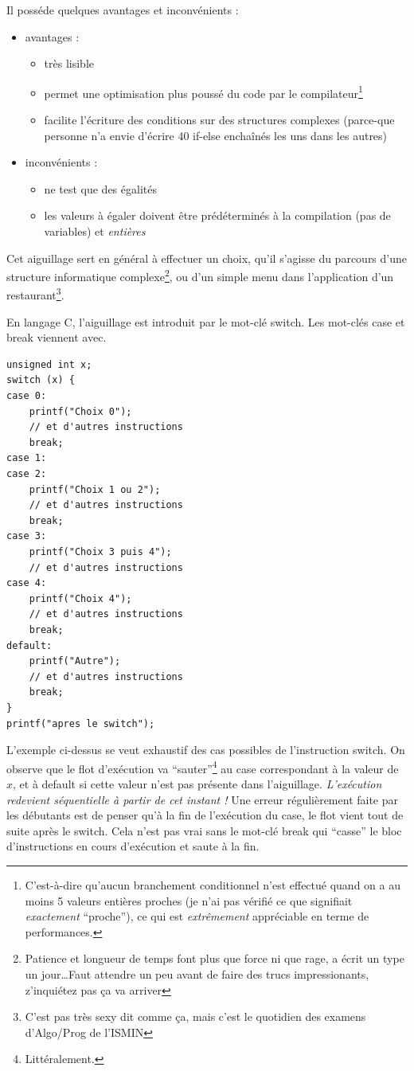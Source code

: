 \documentclass[../../../main.tex]{subfiles}
\begin{document}
Il posséde quelques avantages et inconvénients :
\begin{itemize}
	\item avantages :
	\begin{itemize}
		\item très lisible
		\item permet une optimisation plus poussé du code par le compilateur\footnote{C'est-à-dire qu'aucun branchement conditionnel n'est effectué quand on a au moins 5 valeurs entières proches (je n'ai pas vérifié ce que signifiait \textit{exactement} ``proche''), ce qui est \textit{extrêmement} appréciable en terme de performances.}
		\item facilite l'écriture des conditions sur des structures complexes (parce-que personne n'a envie d'écrire 40 \textsf{if-else} enchaînés les uns dans les autres)
	\end{itemize}
	\item inconvénients : 
	\begin{itemize}
		\item ne test que des égalités
		\item les valeurs à égaler doivent être prédéterminés à la compilation (pas de variables) et \textit{entières}
	\end{itemize}
\end{itemize}
Cet aiguillage sert en général à effectuer un choix, qu'il s'agisse du parcours d'une structure informatique complexe\footnote{Patience et longueur de temps font plus que force ni que rage, a écrit un type un jour\dots Faut attendre un peu avant de faire des trucs impressionants, z'inquiétez pas ça va arriver}, ou d'un simple menu dans l'application d'un restaurant\footnote{C'est pas très sexy dit comme ça, mais c'est le quotidien des examens d'Algo/Prog de l'ISMIN}.
 
En langage C, l'aiguillage est introduit par le mot-clé \textsf{switch}. Les mot-clés \textsf{case} et \textsf{break} viennent avec.
\begin{verbatim}
unsigned int x;
switch (x) {
case 0:
	printf("Choix 0");
	// et d'autres instructions
	break;
case 1:
case 2:
	printf("Choix 1 ou 2");
	// et d'autres instructions
	break;
case 3:
	printf("Choix 3 puis 4");
	// et d'autres instructions
case 4:
	printf("Choix 4");
	// et d'autres instructions
	break;
default:
	printf("Autre");
	// et d'autres instructions
	break;
}
printf("apres le switch");
\end{verbatim}
L'exemple ci-dessus se veut exhaustif des cas possibles de l'instruction \textsf{switch}. On observe que le flot d'exécution va ``sauter''\footnote{Littéralement.} au \textsf{case} correspondant à la valeur de $x$, et à \textsf{default} si cette valeur n'est pas présente dans l'aiguillage. \textit{L'exécution redevient séquentielle à partir de cet instant !} Une erreur régulièrement faite par les débutants est de penser qu'à la fin de l'exécution du \textsf{case}, le flot vient tout de suite après le switch. Cela n'est pas vrai sans le mot-clé \textsf{break} qui ``casse'' le bloc d'instructions en cours d'exécution et saute à la fin.
 
\end{document}
